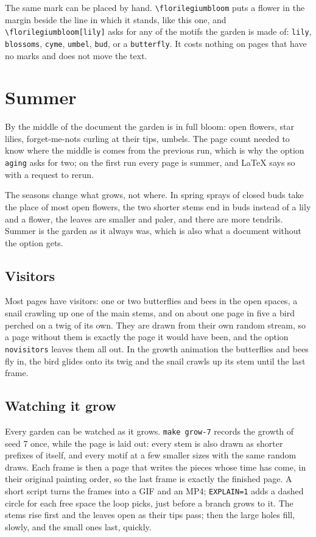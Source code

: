 \documentclass[11pt,a4paper]{article}
\newcommand\code[1]{\texttt{\small #1}}
\begin{document}
The same mark can be placed by hand. \code{\textbackslash florilegiumbloom} puts a flower
in the margin beside the line in which it stands, like this
one\florilegiumbloom, and \code{\textbackslash florilegiumbloom[lily]} asks for any of the
motifs the garden is made of: \code{lily}, \code{blossoms}, \code{cyme}, \code{umbel},
\code{bud}, or a \code{butterfly}. It costs nothing on pages that have no marks and does
not move the text.

\section{Summer}

By the middle of the document the garden is in full bloom: open flowers, star lilies,
forget-me-nots curling at their tips, umbels. The page count needed to know where the
middle is comes from the previous run, which is why the option \code{aging} asks for two;
on the first run every page is summer, and LaTeX says so with a request to rerun.

The seasons change what grows, not where. In spring sprays of closed buds take the place of
most open flowers, the two shorter stems end in buds instead of a lily and a flower, the
leaves are smaller and paler, and there are more tendrils. Summer is the garden as it
always was, which is also what a document without the option gets.

\subsection{Visitors}

Most pages have visitors: one or two butterflies and bees in the open spaces, a snail
crawling up one of the main stems, and on about one page in five a bird perched on a twig
of its own. They are drawn from their own random stream, so a page without them is
exactly the page it would have been, and the option \code{novisitors} leaves them all out.
In the growth animation the butterflies and bees fly in, the bird glides onto its twig
and the snail crawls up its stem until the last frame.

\subsection{Watching it grow}

Every garden can be watched as it grows. \code{make grow-7} records the growth of seed 7
once, while the page is laid out: every stem is also drawn as shorter prefixes of itself,
and every motif at a few smaller sizes with the same random draws. Each frame is then a
page that writes the pieces whose time has come, in their original painting order, so the
last frame is exactly the finished page. A short script turns the frames into a GIF and an
MP4; \code{EXPLAIN=1} adds a dashed circle for each free space the loop picks, just before
a branch grows to it. The stems rise first and the leaves open as their tips pass; then
the large holes fill, slowly, and the small ones last, quickly.
\end{document}
